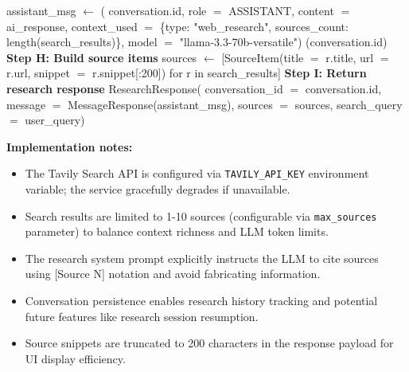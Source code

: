 \begin{algorithm}[H]
\begin{algorithmic}[1]
\State assistant\_msg $\leftarrow$ \texttt{}(
    \Statex \hspace{4em} conversation.id,
    \Statex \hspace{4em} role $=$ ASSISTANT,
    \Statex \hspace{4em} content $=$ ai\_response,
    \Statex \hspace{4em} context\_used $=$ \{type: "web\_research", sources\_count: length(search\_results)\},
    \Statex \hspace{4em} model $=$ "llama-3.3-70b-versatile")
\State \texttt{}(conversation.id)
\State \textbf{Step H: Build source items}
\State sources $\leftarrow$ [SourceItem(title $=$ r.title, url $=$ r.url, snippet $=$ r.snippet[:200]) for r in search\_results]
\State \textbf{Step I: Return research response}
\State \Return ResearchResponse(
    \Statex \hspace{4em} conversation\_id $=$ conversation.id,
    \Statex \hspace{4em} message $=$ MessageResponse(assistant\_msg),
    \Statex \hspace{4em} sources $=$ sources,
    \Statex \hspace{4em} search\_query $=$ user\_query)
\end{algorithmic}\normalsize
\end{algorithm}
\FloatBarrier

\textbf{Implementation notes:}
\begin{itemize}
    \item The Tavily Search API is configured via \texttt{TAVILY\_API\_KEY} environment variable; the service gracefully degrades if unavailable.
    \item Search results are limited to 1-10 sources (configurable via \texttt{max\_sources} parameter) to balance context richness and LLM token limits.
    \item The research system prompt explicitly instructs the LLM to cite sources using [Source N] notation and avoid fabricating information.
    \item Conversation persistence enables research history tracking and potential future features like research session resumption.
    \item Source snippets are truncated to 200 characters in the response payload for UI display efficiency.
\end{itemize}


